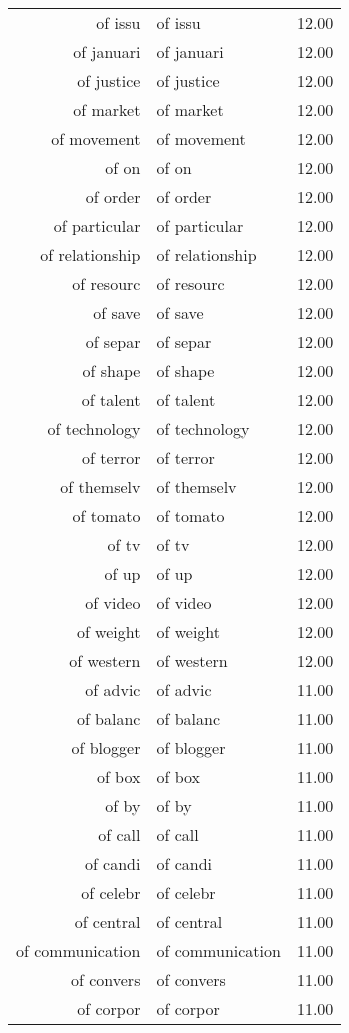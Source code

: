 \begin{table}[ht]
\begin{tabular}{rlr}
  of issu & of issu & 12.00 \\ 
  of januari & of januari & 12.00 \\ 
  of justice & of justice & 12.00 \\ 
  of market & of market & 12.00 \\ 
  of movement & of movement & 12.00 \\ 
  of on & of on & 12.00 \\ 
  of order & of order & 12.00 \\ 
  of particular & of particular & 12.00 \\ 
  of relationship & of relationship & 12.00 \\ 
  of resourc & of resourc & 12.00 \\ 
  of save & of save & 12.00 \\ 
  of separ & of separ & 12.00 \\ 
  of shape & of shape & 12.00 \\ 
  of talent & of talent & 12.00 \\ 
  of technology & of technology & 12.00 \\ 
  of terror & of terror & 12.00 \\ 
  of themselv & of themselv & 12.00 \\ 
  of tomato & of tomato & 12.00 \\ 
  of tv & of tv & 12.00 \\ 
  of up & of up & 12.00 \\ 
  of video & of video & 12.00 \\ 
  of weight & of weight & 12.00 \\ 
  of western & of western & 12.00 \\ 
  of advic & of advic & 11.00 \\ 
  of balanc & of balanc & 11.00 \\ 
  of blogger & of blogger & 11.00 \\ 
  of box & of box & 11.00 \\ 
  of by & of by & 11.00 \\ 
  of call & of call & 11.00 \\ 
  of candi & of candi & 11.00 \\ 
  of celebr & of celebr & 11.00 \\ 
  of central & of central & 11.00 \\ 
  of communication & of communication & 11.00 \\ 
  of convers & of convers & 11.00 \\ 
  of corpor & of corpor & 11.00 \\ 

\end{tabular}
\end{table}
